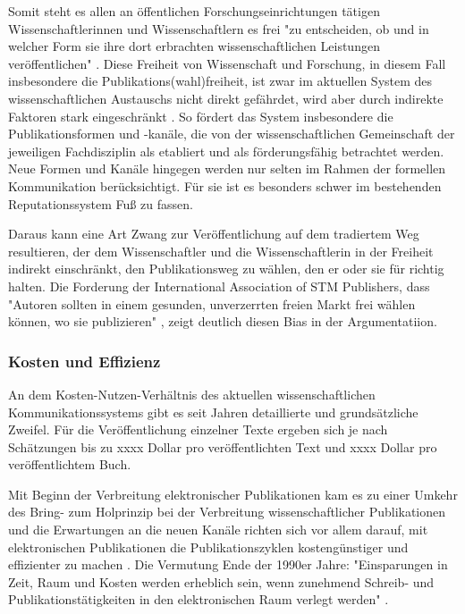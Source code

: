 Somit steht es allen an öffentlichen Forschungseinrichtungen tätigen Wissenschaftlerinnen und Wissenschaftlern es frei "zu entscheiden, ob und in welcher Form sie ihre dort erbrachten wissenschaftlichen Leistungen veröffentlichen" \cite{Schmidt_2009}. Diese Freiheit von Wissenschaft und Forschung, in diesem Fall insbesondere die Publikations(wahl)freiheit, ist zwar im aktuellen System des wissenschaftlichen Austauschs nicht direkt gefährdet, wird aber durch indirekte Faktoren stark eingeschränkt \cite{binswanger_2014_excellence}. So fördert das System insbesondere die Publikationsformen und -kanäle, die von der wissenschaftlichen Gemeinschaft der jeweiligen Fachdisziplin als etabliert und als förderungsfähig betrachtet werden. Neue Formen und Kanäle hingegen werden nur selten im Rahmen der formellen Kommunikation berücksichtigt. Für sie ist es besonders schwer im bestehenden Reputationssystem Fuß zu fassen.

Daraus kann eine Art Zwang zur Veröffentlichung auf dem tradiertem Weg resultieren, der dem Wissenschaftler und die Wissenschaftlerin in der Freiheit indirekt einschränkt, den Publikationsweg zu wählen, den er oder sie für richtig halten. Die Forderung der International Association of STM Publishers, dass "Autoren sollten in einem gesunden, unverzerrten freien Markt frei wählen können, wo sie publizieren" \cite{Brussels_Declaration_2007}, zeigt deutlich diesen Bias in der Argumentatiion.

\subsubsection{Kosten und Effizienz}

An dem Kosten-Nutzen-Verhältnis des aktuellen wissenschaftlichen Kommunikationssystems gibt es seit Jahren detaillierte und grundsätzliche Zweifel. Für die Veröffentlichung einzelner Texte ergeben sich je nach Schätzungen bis zu xxxx Dollar pro veröffentlichten Text und xxxx Dollar pro veröffentlichtem Buch.

Mit Beginn der Verbreitung elektronischer Publikationen kam es zu einer Umkehr des Bring- zum Holprinzip bei der Verbreitung wissenschaftlicher Publikationen und die Erwartungen an die neuen Kanäle richten sich vor allem darauf, mit elektronischen Publikationen die  Publikationszyklen kostengünstiger und effizienter zu machen \cite{Brueggemann-Klein_1995}. Die Vermutung Ende der 1990er Jahre: "Einsparungen in Zeit, Raum und Kosten werden erheblich sein, wenn zunehmend Schreib- und Publikationstätigkeiten in den elektronischen Raum verlegt werden" \cite{roberts_1999_scholarly}.

